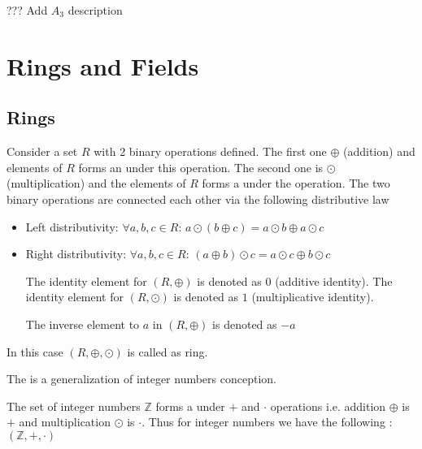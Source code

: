 \begin{appendices}
\begin{example}[$S_3$ group]
  
  
  ??? Add $A_3$ description
  \label{ex:s3group}
\end{example}

\section{Rings and Fields}

\subsection{Rings}

\begin{definition}[Ring]
  Consider a set $R$ with 2 binary operations defined. The first one
  $\oplus$ (addition) and elements of $R$ forms an
  under this operation. The second one is $\odot$ (multiplication) and
  the elements of $R$ forms a  under 
  the operation. The two binary operations are connected each other
  via the following distributive law
  \begin{itemize}
  \item Left distributivity:
    $\forall a,b,c \in R$:
    $a \odot \left(b \oplus c\right) =
    a \odot b \oplus a \odot c$
  \item Right distributivity:
    $\forall a,b,c \in R$:
    $\left( a \oplus b \right) \odot c =
    a \odot c \oplus b \odot c$
    
  The identity element for $\left(R, \oplus\right)$ is denoted as $0$
  (additive identity).
  The identity element for $\left(R, \odot\right)$ is denoted as $1$
  (multiplicative identity).

  The inverse element to $a$ in $\left(R, \oplus\right)$ is denoted as $-a$
  \end{itemize}

  In this case $\left(R, \oplus, \odot\right)$ is called as ring.
  \label{def:ring}
\end{definition}

The  is a generalization of integer numbers conception.
\begin{example}
  The set of integer numbers $\mathbb{Z}$ forms a 
  under $+$ and $\cdot$ operations i.e. addition $\oplus$ is
  $+$ and multiplication $\odot$ is $\cdot$. Thus for integer
  numbers we have the following :
  $\left(\mathbb{Z}, +, \cdot\right)$
  \label{ex:ring}
\end{example}


\end{appendices}
